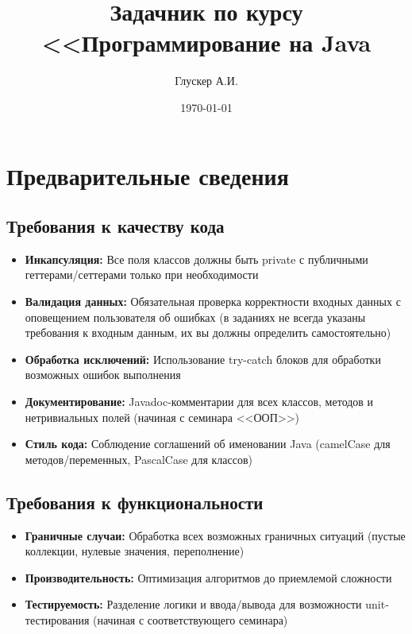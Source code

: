 \documentclass[12pt]{article}
\title{Задачник по курсу <<Программирование на Java}
\author{Глускер А.И.}
\date{\today}
\begin{document}
\maketitle
\newpage

\tableofcontents
\newpage

\section{Предварительные сведения}

\subsection*{Требования к качеству кода}
\begin{itemize}
\item \textbf{Инкапсуляция:} Все поля классов должны быть private с 
публичными геттерами/сеттерами только при необходимости
    \item \textbf{Валидация данных:} Обязательная проверка корректности 
    входных данных с оповещением пользователя об ошибках (в заданиях не всегда указаны 
    требования к входным данным, их вы должны определить самостоятельно)
    \item \textbf{Обработка исключений:} Использование try-catch блоков для обработки 
    возможных ошибок выполнения
    \item \textbf{Документирование:} Javadoc-комментарии для всех классов, 
    методов и нетривиальных полей (начиная с семинара <<ООП>>)
    \item \textbf{Стиль кода:} Соблюдение соглашений об именовании Java 
    (camelCase для методов/переменных, PascalCase для классов)
\end{itemize}

\subsection*{Требования к функциональности}
\begin{itemize}
\item \textbf{Граничные случаи:} Обработка всех возможных граничных ситуаций 
(пустые коллекции, нулевые значения, переполнение)
    \item \textbf{Производительность:} Оптимизация алгоритмов до приемлемой сложности 
    \item \textbf{Тестируемость:} Разделение логики и ввода/вывода для возможности 
    unit-тестирования (начиная с соответствующего семинара)
\end{itemize}
\end{document}
